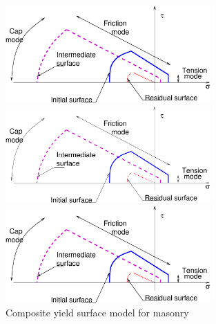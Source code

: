 \documentclass[a4paper]{article}
\begin{document}
\begin{figure}[!htb]
\begin{htmlonly}
  \centerline{\includegraphics[width=0.7\textwidth]{constmodel.eps}}
\end{htmlonly}
\ifpdf
 \centerline{\includegraphics[width=0.7\textwidth]{constmodel.pdf}}
\else
 \centerline{\includegraphics[width=0.7\textwidth]{constmodel.eps}}
\fi
  \caption{Composite yield surface model for masonry}
  \label{compyieldsurffig}
\end{figure}
\end{document}
